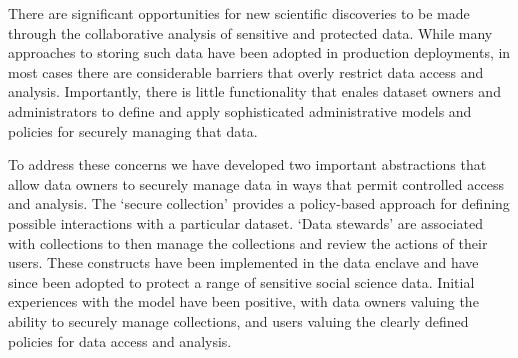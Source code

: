 


There are significant opportunities for new scientific discoveries to be made
through the collaborative analysis of sensitive and protected
data. While many approaches to storing such data
have been adopted in production deployments, in most cases there are
considerable barriers that overly restrict data access and analysis. 
Importantly, there is little functionality that enales dataset owners and administrators
to define and apply sophisticated administrative models and policies 
for securely managing that data. 

To address these concerns we have developed two important abstractions
that allow data owners to securely manage data in ways that permit
controlled access and analysis. The `secure collection' provides a 
policy-based approach for defining possible interactions with a particular
dataset. `Data stewards' are associated with collections to then
manage the collections and review the actions of their users. These
constructs have been implemented in the \NAME data enclave
and have since been adopted to protect a range of sensitive
social science data. Initial experiences with the model
have been positive, with data owners valuing the ability 
to securely manage collections, and users valuing the clearly
defined policies for data access and analysis. 
